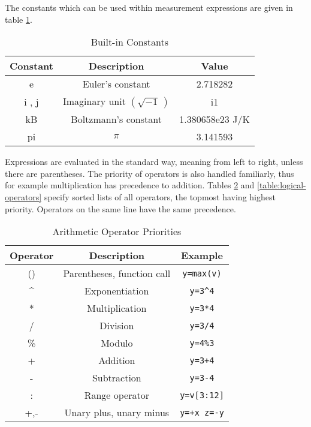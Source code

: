 
The constants which can be used within measurement expressions are
given in table \ref{table:constants}.

%
\begin{table}[ht]
\begin{center}\begin{tabular}{|c|c|c|}
\hline 
Constant&
Description&
Value\tabularnewline
\hline
\hline 
e&
Euler's constant&
2.718282\tabularnewline
\hline 
i , j&
Imaginary unit $\left(\sqrt{-1}\,\right)$&
i1\tabularnewline
\hline 
kB&
Boltzmann's constant&
1.380658e23 J/K\tabularnewline
\hline 
pi&
$\pi$&
3.141593\tabularnewline
\hline
\end{tabular}\end{center}


\caption{\label{table:constants}Built-in Constants}
\end{table}






Expressions are evaluated in the standard way, meaning from left to
right, unless there are parentheses. The priority of operators is
also handled familiarly, thus for example multiplication has precedence
to addition. Tables \ref{table:arithmetical-operators} and \ref{table:logical-operators}
 specify sorted lists of all operators, the topmost having highest priority. Operators on
the same line have the same precedence.

%
\begin{table}[ht]
\begin{center}\begin{tabular}{|c|c|c|}
\hline 
Operator&
Description&
Example\tabularnewline
\hline
\hline 
()&
Parentheses, function call&
\texttt{y=max(v)}\tabularnewline
\hline 
\textasciicircum{}&
Exponentiation&
\texttt{y=3\textasciicircum{}4}\tabularnewline
\hline 
{*}&
Multiplication&
\texttt{y=3{*}4}\tabularnewline
/&
Division&
\texttt{y=3/4}\tabularnewline
\%&
Modulo&
\texttt{y=4\%3}\tabularnewline
\hline 
+&
Addition&
\texttt{y=3+4}\tabularnewline
-&
Subtraction&
\texttt{y=3-4}\tabularnewline
\hline 
:&
Range operator&
\texttt{y=v[3:12]}\tabularnewline
+,-&
Unary plus, unary minus&
\texttt{y=+x z=-y}\tabularnewline
\hline
\end{tabular}\end{center}

\caption{\label{table:arithmetical-operators}Arithmetic Operator Priorities}
\end{table}

